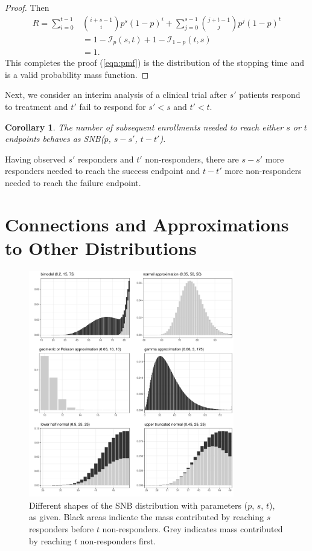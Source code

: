 \documentclass[12pt]{article}
\newtheorem{corollary}{Corollary}
\begin{document}
\begin{proof}
Then
\begin{align*}
R = \sum_{i=0}^{t-1} &{i+s-1 \choose i} p^s (1-p)^i +
\sum_{j=0}^{s-1}  {j+t-1 \choose j} p^j  (1-p)^t \\
   &= 1-\mathcal{I}_p(s, t) + 1 - \mathcal{I}_{1-p}(t, s) \\
   &= 1. 
\end{align*}
This completes the proof (\ref{eqn:pmf}) is the distribution of the
stopping time and is a valid probability mass function.
\end{proof}

Next, we consider an interim analysis of a clinical trial after $s'$ 
patients respond to treatment 
and $t'$ fail to respond for $s' < s$ and $t' < t$.
\begin{corollary} \label{conditional_distribution}
The number of subsequent enrollments needed 
to reach either $s$ or $t$ endpoints behaves as SNB($p$, $s-s'$, $t-t'$).
\end{corollary}
Having observed $s'$ responders and $t'$ non-responders, there are $s-s'$ 
more responders needed to reach the success endpoint and $t-t'$ more 
non-responders needed to reach the failure endpoint.

\section{Connections and Approximations to Other Distributions}

\begin{figure}[p!]
\begin{center}
\includegraphics[width=0.8\textwidth]{shapes.pdf}
\end{center}
\caption{Different shapes of the SNB distribution with parameters 
($p$, $s$, $t$), as given. Black areas indicate the mass contributed by reaching
$s$ responders before $t$ non-responders. Grey indicates
mass contributed by reaching $t$ non-responders first. \label{shapes.fig}}
\end{figure}
\end{document}
